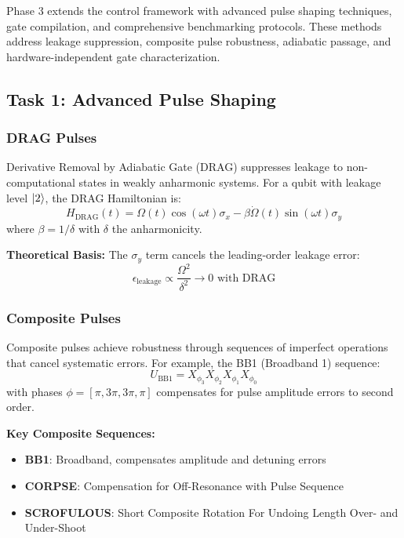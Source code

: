 \documentclass[11pt,a4paper]{article}
\theoremstyle{definition}
\theoremstyle{remark}
\begin{document}
Phase 3 extends the control framework with advanced pulse shaping techniques, gate compilation, and comprehensive benchmarking protocols. These methods address leakage suppression, composite pulse robustness, adiabatic passage, and hardware-independent gate characterization.

\subsection{Task 1: Advanced Pulse Shaping}

\subsubsection{DRAG Pulses}

Derivative Removal by Adiabatic Gate (DRAG) suppresses leakage to non-computational states in weakly anharmonic systems. For a qubit with leakage level $\ket{2}$, the DRAG Hamiltonian is:
\begin{equation}
H_{\text{DRAG}}(t) = \Omega(t)\cos(\omega t)\sigma_x - \beta\dot{\Omega}(t)\sin(\omega t)\sigma_y
\end{equation}
where $\beta = 1/\delta$ with $\delta$ the anharmonicity.

\textbf{Theoretical Basis:} The $\sigma_y$ term cancels the leading-order leakage error:
\begin{equation}
\epsilon_{\text{leakage}} \propto \frac{\Omega^2}{\delta^2} \rightarrow 0 \text{ with DRAG}
\end{equation}

\subsubsection{Composite Pulses}

Composite pulses achieve robustness through sequences of imperfect operations that cancel systematic errors. For example, the BB1 (Broadband 1) sequence:
\begin{equation}
U_{\text{BB1}} = X_{\phi_3} X_{\phi_2} X_{\phi_1} X_{\phi_0}
\end{equation}
with phases $\phi = [\pi, 3\pi, 3\pi, \pi]$ compensates for pulse amplitude errors to second order.

\textbf{Key Composite Sequences:}
\begin{itemize}
    \item \textbf{BB1}: Broadband, compensates amplitude and detuning errors
    \item \textbf{CORPSE}: Compensation for Off-Resonance with Pulse Sequence
    \item \textbf{SCROFULOUS}: Short Composite Rotation For Undoing Length Over- and Under-Shoot
\end{itemize}
\end{document}
